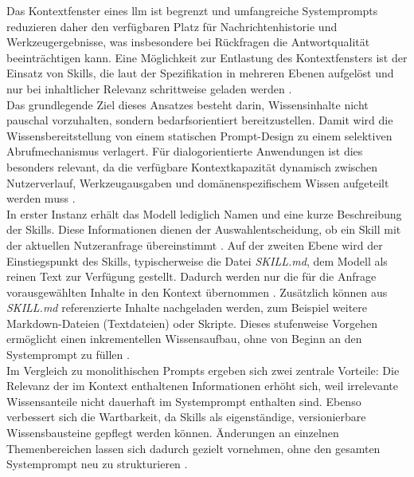 Das Kontextfenster eines \gls{llm} ist begrenzt und umfangreiche Systemprompts reduzieren daher den verfügbaren Platz für Nachrichtenhistorie und Werkzeugergebnisse, was insbesondere bei Rückfragen die Antwortqualität beeinträchtigen kann.
Eine Möglichkeit zur Entlastung des Kontextfensters ist der Einsatz von Skills, die laut der Spezifikation in mehreren Ebenen aufgelöst und nur bei inhaltlicher Relevanz schrittweise geladen werden \cite{agentskills_github}. \\

Das grundlegende Ziel dieses Ansatzes besteht darin, Wissensinhalte nicht pauschal vorzuhalten, sondern bedarfsorientiert bereitzustellen. Damit wird die Wissensbereitstellung von einem statischen Prompt-Design zu einem selektiven Abrufmechanismus verlagert. 
Für dialogorientierte Anwendungen ist dies besonders relevant, da die verfügbare Kontextkapazität dynamisch zwischen Nutzerverlauf, Werkzeugausgaben und domänenspezifischem Wissen aufgeteilt werden muss \cite{agentskills_github}. \\

In erster Instanz erhält das Modell lediglich Namen und eine kurze Beschreibung der Skills. 
Diese Informationen dienen der Auswahlentscheidung, ob ein Skill mit der aktuellen Nutzeranfrage übereinstimmt \cite{agentskills_github}.
Auf der zweiten Ebene wird der Einstiegspunkt des Skills, typischerweise die Datei \mbox{\textit{SKILL.md}}, dem Modell als reinen Text zur Verfügung gestellt. 
Dadurch werden nur die für die Anfrage vorausgewählten Inhalte in den Kontext übernommen \cite{agentskills_github}.
Zusätzlich können aus \mbox{\textit{SKILL.md}} referenzierte Inhalte nachgeladen werden, zum Beispiel weitere Markdown-Dateien (Textdateien) oder Skripte. 
Dieses stufenweise Vorgehen ermöglicht einen inkrementellen Wissensaufbau, ohne von Beginn an den Systemprompt zu füllen \cite{agentskills_github}. \\

Im Vergleich zu monolithischen Prompts ergeben sich zwei zentrale Vorteile: Die Relevanz der im Kontext enthaltenen Informationen erhöht sich, weil irrelevante Wissensanteile nicht dauerhaft im Systemprompt enthalten sind. 
Ebenso verbessert sich die Wartbarkeit, da Skills als eigenständige, versionierbare Wissensbausteine gepflegt werden können. 
Änderungen an einzelnen Themenbereichen lassen sich dadurch gezielt vornehmen, ohne den gesamten Systemprompt neu zu strukturieren \cite{agentskills_github}. \\

